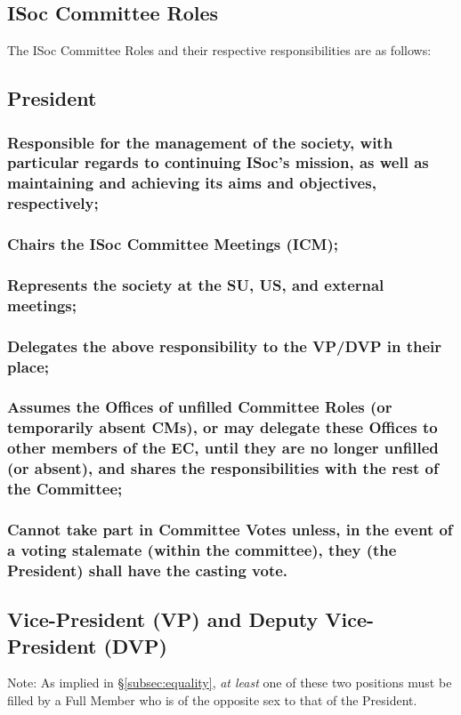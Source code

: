 \documentclass[12pt]{article}
\begin{document}
\subsection{ISoc Committee Roles}
The ISoc Committee Roles and their respective responsibilities are as follows:

\subsection{President}
\subsubsection{Responsible for the management of the society, with particular regards to continuing ISoc's mission, as well as maintaining and achieving its aims and objectives, respectively;}
\subsubsection{Chairs the ISoc Committee Meetings (ICM);}
\subsubsection{Represents the society at the SU, US, and external meetings;}
\subsubsection{Delegates the above responsibility to the VP/DVP in their place;}
\subsubsection{Assumes the Offices of unfilled Committee Roles (or temporarily absent CMs), or may delegate these Offices to other members of the EC, until they are no longer unfilled (or absent), and shares the responsibilities with the rest of the Committee;}
\label{subsubsec:unfulfilled}
\subsubsection{Cannot take part in Committee Votes unless, in the event of a voting stalemate (within the committee), they (the President) shall have the casting vote.}
\hspace{1pt}

\subsection{Vice-President (VP) and Deputy Vice-President (DVP)}
Note: As implied in \S\ref{subsec:equality}, \emph{at least} one of these two positions must be filled by a Full Member who is of the opposite sex to that of the President.
\end{document}
